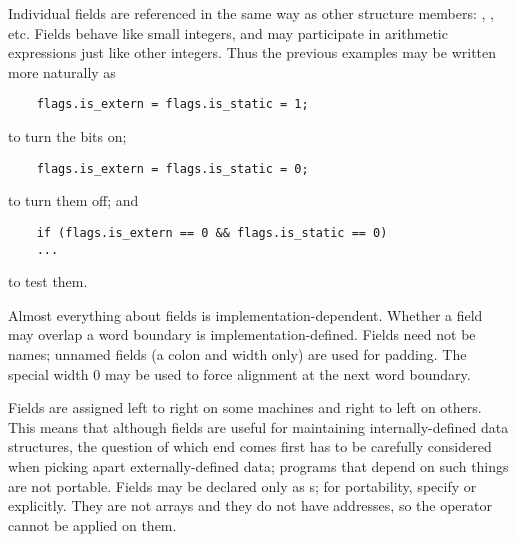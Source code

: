 Individual fields are referenced in the same way as other structure members: , , etc.
Fields behave like small integers, and may participate in arithmetic expressions just like other integers.
Thus the previous examples may be written more naturally as
\begin{lstlisting}
	flags.is_extern = flags.is_static = 1;
\end{lstlisting}
to turn the bits on;
\begin{lstlisting}
	flags.is_extern = flags.is_static = 0;
\end{lstlisting}
to turn them off; and
\begin{lstlisting}
	if (flags.is_extern == 0 && flags.is_static == 0)
	...
\end{lstlisting}
to test them.

Almost everything about fields is implementation-dependent. Whether a field may overlap a word boundary is implementation-defined.
Fields need not be names; unnamed fields (a colon and width only) are used for padding.
The special width 0 may be used to force alignment at the next word boundary.

Fields are assigned left to right on some machines and right to left on others.
This means that although fields are useful for maintaining internally-defined data structures, the question of which end comes first has to be carefully considered when picking apart externally-defined
data; programs that depend on such things are not portable.
Fields may be declared only as s; for portability, specify  or  explicitly.
They are not arrays and they do not have addresses, so the \code{\&} operator cannot be applied on them.


